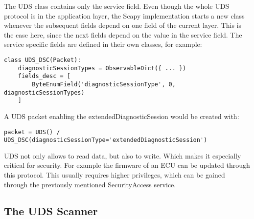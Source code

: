 
The UDS class contains only the service field. Even though the whole UDS protocol is in the application layer, the Scapy implementation starts a new class whenever the subsequent fields depend on one field of the current layer. This is the case here, since the next fields depend on the value in the service field. The service specific fields are defined in their own classes, for example:

\begin{samepage}
\begin{verbatim}
class UDS_DSC(Packet):
    diagnosticSessionTypes = ObservableDict({ ... })
    fields_desc = [
        ByteEnumField('diagnosticSessionType', 0,  diagnosticSessionTypes)
    ]
\end{verbatim}
\end{samepage}

A UDS packet enabling the extendedDiagnosticSession would be created with:

\begin{samepage}
\begin{verbatim}
packet = UDS() / UDS_DSC(diagnosticSessionType='extendedDiagnosticSession')
\end{verbatim}
\end{samepage}

UDS not only allows to read data, but also to write. Which makes it especially critical for security. For example the firmware of an ECU can be updated through this protocol. This usually requires higher privileges, which can be gained through the previously mentioned SecurityAccess service.


\subsection{The UDS Scanner}

